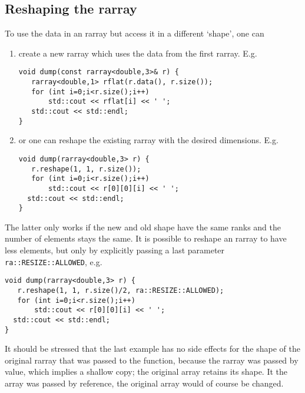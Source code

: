 \documentclass[11pt,twoside]{article}
\begin{document}
\subsection{Reshaping the rarray}

To use the data in an rarray but access it in a different `shape', one can
\begin{enumerate}
  \item create a new rarray which uses the data from the first rarray. E.g.
\vspace{-9pt}
\begin{framed}\vspace{-3pt}%
\begin{verbatim}
void dump(const rarray<double,3>& r) {
   rarray<double,1> rflat(r.data(), r.size());
   for (int i=0;i<r.size();i++)
       std::cout << rflat[i] << ' ';
   std::cout << std::endl;
}
\end{verbatim}%
\vspace{-12pt}
\end{framed}\vspace{-8pt}
\item or one can reshape the existing rarray with the desired
  dimensions. E.g.
\vspace{-2pt}
\begin{framed}\vspace{-4pt}%
\begin{verbatim}
void dump(rarray<double,3> r) {
   r.reshape(1, 1, r.size());
   for (int i=0;i<r.size();i++)
       std::cout << r[0][0][i] << ' ';
  std::cout << std::endl;
}
\end{verbatim}%
\vspace{-12pt}
\end{framed}\vspace{-8pt}
\end{enumerate}
The latter only works if the new and old shape have the same ranks and
the number of elements stays the same. It is possible to reshape an
rarray to have less elements, but only by explicitly passing a last
parameter \texttt{ra::RESIZE::ALLOWED}, e.g.
\begin{framed}\vspace{-4pt}%
\begin{verbatim}
void dump(rarray<double,3> r) {
   r.reshape(1, 1, r.size()/2, ra::RESIZE::ALLOWED);
   for (int i=0;i<r.size();i++)
       std::cout << r[0][0][i] << ' ';
  std::cout << std::endl;
}
\end{verbatim}%
\vspace{-12pt}
\end{framed}\vspace{-8pt}
\noindent It should be stressed that the last example has no side effects for
the shape of the original rarray that was passed to the function,
because the rarray was passed by value, which implies a shallow copy;
the original array retains its shape. It the array was passed by
reference, the original array would of course be changed.
\end{document}
